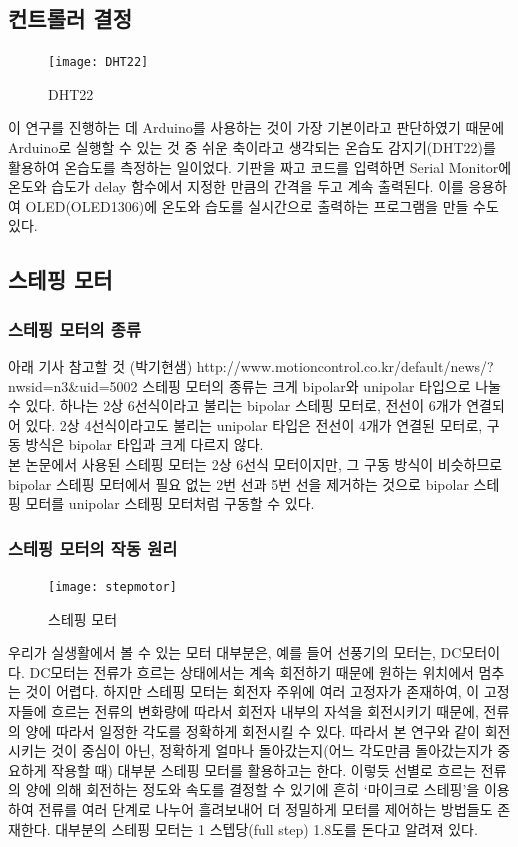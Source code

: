 \subsection{컨트롤러 결정}

\begin{figure}
	\texttt{[image: DHT22]}
	\caption{DHT22}
	\label{fig:DHT22}
\end{figure}
이 연구를 진행하는 데 Arduino를 사용하는 것이 가장 기본이라고 판단하였기 때문에 Arduino로 실행할 수 있는 것 중 쉬운 축이라고 생각되는 온습도 감지기(DHT22)를 활용하여 온습도를 측정하는 일이었다. 기판을 짜고 코드를 입력하면 Serial Monitor에 온도와 습도가 delay 함수에서 지정한 만큼의 간격을 두고 계속 출력된다. 이를 응용하여 OLED(OLED1306)에 온도와 습도를 실시간으로 출력하는 프로그램을 만들 수도 있다.

\subsection{스테핑 모터}

\subsubsection{스테핑 모터의 종류}

아래 기사 참고할 것 (박기현샘)
http://www.motioncontrol.co.kr/default/news/?nwsid=n3&uid=5002
스테핑 모터의 종류는 크게 bipolar와 unipolar 타입으로 나눌 수 있다. 하나는 2상 6선식이라고 불리는 bipolar 스테핑 모터로, 전선이 6개가 연결되어 있다. 2상 4선식이라고도 불리는 unipolar 타입은 전선이 4개가 연결된 모터로, 구동 방식은 bipolar 타입과 크게 다르지 않다.\\
본 논문에서 사용된 스테핑 모터는 2상 6선식 모터이지만, 그 구동 방식이 비슷하므로 bipolar 스테핑 모터에서 필요 없는 2번 선과 5번 선을 제거하는 것으로 bipolar 스테핑 모터를 unipolar 스테핑 모터처럼 구동할 수 있다.

\subsubsection{스테핑 모터의 작동 원리}

\begin{figure}
	\texttt{[image: stepmotor]}
	\caption{스테핑 모터}
	\label{fig:stepmotor}
\end{figure}
우리가 실생활에서 볼 수 있는 모터 대부분은, 예를 들어 선풍기의 모터는, DC모터이다. DC모터는 전류가 흐르는 상태에서는 계속 회전하기 때문에 원하는 위치에서 멈추는 것이 어렵다. 하지만 스테핑 모터는 회전자 주위에 여러 고정자가 존재하여, 이 고정자들에 흐르는 전류의 변화량에 따라서 회전자 내부의 자석을 회전시키기 때문에, 전류의 양에 따라서 일정한 각도를 정확하게 회전시킬 수 있다. 따라서 본 연구와 같이 회전시키는 것이 중심이 아닌, 정확하게 얼마나 돌아갔는지(어느 각도만큼 돌아갔는지가 중요하게 작용할 때) 대부분 스테핑 모터를 활용하고는 한다. 이렇듯 선별로 흐르는 전류의 양에 의해 회전하는 정도와 속도를 결정할 수 있기에 흔히 ‘마이크로 스테핑’을 이용하여 전류를 여러 단계로 나누어 흘려보내어 더 정밀하게 모터를 제어하는 방법들도 존재한다. 대부분의 스테핑 모터는 1 스텝당(full step) 1.8도를 돈다고 알려져 있다.



